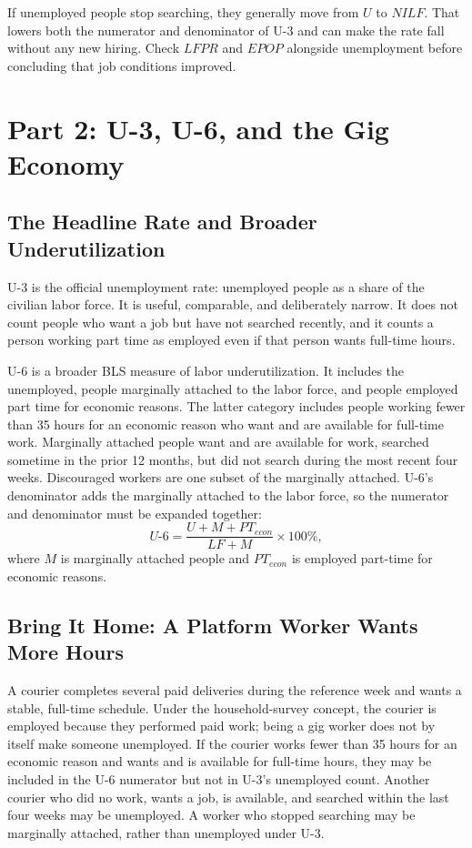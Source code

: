 \documentclass[11pt,letterpaper]{article}
\begin{document}
\begin{tcolorbox}[colback=yellow!10!white,colframe=orange!80!black,title=\textbf{Clear It Up: A Falling U-3 Rate Can Hide a Falling Labor Force}]
If unemployed people stop searching, they generally move from $U$ to $NILF$. That lowers both the numerator and denominator of U-3 and can make the rate fall without any new hiring. Check $LFPR$ and $EPOP$ alongside unemployment before concluding that job conditions improved.
\end{tcolorbox}

\section{Part 2: U-3, U-6, and the Gig Economy}
\subsection{The Headline Rate and Broader Underutilization}
U-3 is the official unemployment rate: unemployed people as a share of the civilian labor force. It is useful, comparable, and deliberately narrow. It does not count people who want a job but have not searched recently, and it counts a person working part time as employed even if that person wants full-time hours.

U-6 is a broader BLS measure of labor underutilization. It includes the unemployed, people marginally attached to the labor force, and people employed part time for economic reasons. The latter category includes people working fewer than 35 hours for an economic reason who want and are available for full-time work. Marginally attached people want and are available for work, searched sometime in the prior 12 months, but did not search during the most recent four weeks. Discouraged workers are one subset of the marginally attached. U-6's denominator adds the marginally attached to the labor force, so the numerator and denominator must be expanded together:
\begin{equation}
U\text{-}6 =
\frac{U + M + PT_{econ}}{LF + M}\times100\%,
\end{equation}
where $M$ is marginally attached people and $PT_{econ}$ is employed part-time for economic reasons.

\subsection{Bring It Home: A Platform Worker Wants More Hours}
A courier completes several paid deliveries during the reference week and wants a stable, full-time schedule. Under the household-survey concept, the courier is employed because they performed paid work; being a gig worker does not by itself make someone unemployed. If the courier works fewer than 35 hours for an economic reason and wants and is available for full-time hours, they may be included in the U-6 numerator but not in U-3's unemployed count. Another courier who did no work, wants a job, is available, and searched within the last four weeks may be unemployed. A worker who stopped searching may be marginally attached, rather than unemployed under U-3.
\end{document}
